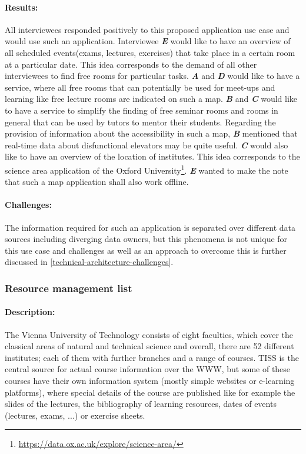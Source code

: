 \documentclass{article}
\begin{document}
\paragraph{Results:}
All interviewees responded positively to this proposed application use case and would use such an application. Interviewee \textit{\textbf{E}} would like to have an overview of all scheduled events(exams, lectures, exercises) that take place in a certain room at a particular date. This idea corresponds to the demand of all other interviewees to find free rooms for particular tasks. \textit{\textbf{A}} and \textit{\textbf{D}} would like to have a service, where all free rooms that can potentially be used for meet-ups and learning like free lecture rooms are indicated on such a map. \textit{\textbf{B}} and \textit{\textbf{C}} would like to have a service to simplify the finding of free seminar rooms and rooms in general that can be used by tutors to mentor their students. Regarding the provision of information about the accessibility in such a map, \textit{\textbf{B}} mentioned that real-time data about disfunctional elevators may be quite useful. \textit{\textbf{C}} would also like to have an overview of the location of institutes. This idea corresponds to the science area application of the Oxford University\footnote{\url{https://data.ox.ac.uk/explore/science-area/}}. \textit{\textbf{E}} wanted to make the note that such a map application shall also work offline.

\paragraph{Challenges:}
The information required for such an application is separated over different data sources including diverging data owners, but this phenomena is not unique for this use case and challenges as well as an approach to overcome this is further discussed in \ref{technical-architecture-challenges}.

\subsubsection{Resource management list}
\label{lod-benefits-challenges:explored-needs-usecases:rlm}

\paragraph{Description:}
The Vienna University of Technology consists of eight faculties, which cover the classical areas of natural and technical science and overall, there are 52 different institutes; each of them with further branches and a range of courses. TISS is the central source for actual course information over the WWW, but some of these courses have their own information system (mostly simple websites or e-learning platforms), where special details of the course are published like for example the slides of the lectures, the bibliography of learning resources, dates of events (lectures, exams, ...) or exercise sheets.
\end{document}
